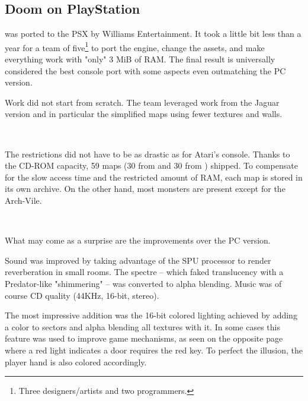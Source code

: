 \subsection{Doom on PlayStation}
\doom{} was ported to the PSX by Williams Entertainment. It took a little bit less than a year for a team of five\footnote{Three designers/artists and two programmers.} to port the engine, change the assets, and make everything work with "only" 3 MiB of RAM. The final result is universally considered the best console port with some aspects even outmatching the PC version.\\
\par
Work did not start from scratch. The team leveraged work from the Jaguar version and in particular the simplified maps using fewer textures and walls.\\
\par
{}\\
\par
  The restrictions did not have to be as drastic as for Atari's console. Thanks to the CD-ROM capacity, 59 maps (30 from \doom{} and 30 from \doomii{}) shipped. To compensate for the slow access time and the restricted amount of RAM, each map is stored in its own  archive. On the other hand, most monsters are present except for the Arch-Vile.\\
\par
{}\\
\par
What may come as a surprise are the improvements over the PC version.\\
\par
Sound was improved by taking advantage of the SPU processor to render reverberation in small rooms. The spectre -- which faked translucency with a Predator-like "shimmering" -- was converted to alpha blending. Music was of course CD quality (44KHz, 16-bit, stereo).\\
\par
 The most impressive addition was the 16-bit colored lighting achieved by adding a color to sectors and alpha blending all textures with it. In some cases this feature was used to improve game mechanisms, as seen on the opposite page where a red light indicates a door requires the red key. To perfect the illusion, the player hand is also colored accordingly.\\
\par


